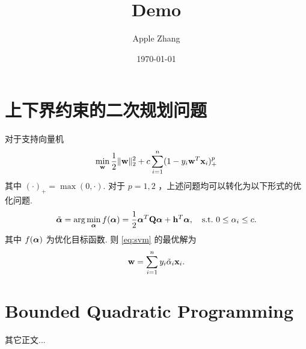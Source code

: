 \documentclass{article}
\title{Demo}
\author{Apple Zhang}
\date{\today}
\begin{document}
\maketitle


\section{上下界约束的二次规划问题}
对于支持向量机
\begin{align}
    \min_{{\mathbf w}}\frac12\|{\mathbf w}\|_2^2+c\sum_{i=1}^n(1-y_i{\mathbf w}^T{\mathbf x}_i)^{p}_+\label{eq:svm}
\end{align}
其中 $(\cdot)_+=\max(0,\cdot)$.
对于 $p=1,2$ ，上述问题均可以转化为以下形式的优化问题.
\begin{align}
    \tilde{{\bm\alpha}}=\arg\min_{{\bm\alpha}}f({\bm\alpha})=\frac12{\bm\alpha}^T{\mathbf Q}{\bm\alpha}+{\mathbf h}^T{\bm\alpha},\quad \mathrm{s.t.}~0\leq\alpha_i\leq c.\label{eq:boxqp}
\end{align}
其中 $f({\bm\alpha})$ 为优化目标函数.
则 \eqref{eq:svm} 的最优解为
\begin{equation}
    {\mathbf w}=\sum_{i=1}^ny_i\tilde\alpha_i{\mathbf x}_i.
\end{equation}


\section{Bounded Quadratic Programming}
其它正文...




\end{document}

